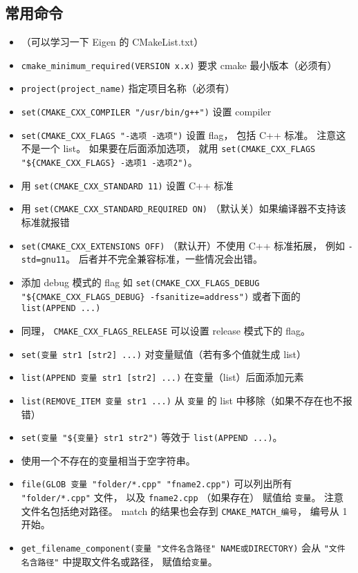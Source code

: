 \subsection{常用命令}
\begin{itemize}
\item （可以学习一下 Eigen 的 CMakeList.txt）
\item \verb`cmake_minimum_required(VERSION x.x)` 要求 cmake 最小版本（必须有）
\item \verb`project(project_name)` 指定项目名称（必须有）
\item \verb`set(CMAKE_CXX_COMPILER "/usr/bin/g++")` 设置 compiler
\item \verb`set(CMAKE_CXX_FLAGS "-选项 -选项")` 设置 flag， 包括 C++ 标准。 注意这不是一个 list。 如果要在后面添加选项， 就用 \verb`set(CMAKE_CXX_FLAGS "${CMAKE_CXX_FLAGS} -选项1 -选项2")`。
\item 用 \verb`set(CMAKE_CXX_STANDARD 11)` 设置 C++ 标准
\item 用 \verb`set(CMAKE_CXX_STANDARD_REQUIRED ON)` （默认关）如果编译器不支持该标准就报错
\item \verb`set(CMAKE_CXX_EXTENSIONS OFF)` （默认开）不使用 C++ 标准拓展， 例如 \verb`-std=gnu11`。 后者并不完全兼容标准，一些情况会出错。
\item 添加 debug 模式的 flag 如 \verb`set(CMAKE_CXX_FLAGS_DEBUG "${CMAKE_CXX_FLAGS_DEBUG} -fsanitize=address")` 或者下面的 \verb`list(APPEND ...)`
\item 同理， \verb`CMAKE_CXX_FLAGS_RELEASE` 可以设置 release 模式下的 flag。
\item \verb`set(变量 str1 [str2] ...)` 对变量赋值（若有多个值就生成 list）
\item \verb`list(APPEND 变量 str1 [str2] ...)` 在变量（list）后面添加元素
\item \verb`list(REMOVE_ITEM 变量 str1 ...)` 从 \verb`变量` 的 list 中移除（如果不存在也不报错）
\item \verb`set(变量 "${变量} str1 str2")` 等效于 \verb`list(APPEND ...)`。
\item 使用一个不存在的变量相当于空字符串。
\item \verb`file(GLOB 变量 "folder/*.cpp" "fname2.cpp")` 可以列出所有 \verb`"folder/*.cpp"` 文件， 以及 \verb`fname2.cpp` （如果存在） 赋值给 \verb`变量`。 注意文件名包括绝对路径。 match 的结果也会存到 \verb`CMAKE_MATCH_编号`， 编号从 1 开始。
\item \verb`get_filename_component(变量 "文件名含路径" NAME或DIRECTORY)` 会从 \verb`"文件名含路径"` 中提取文件名或路径， 赋值给\verb`变量`。

\end{itemize}
